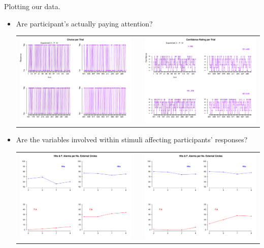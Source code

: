 \documentclass[final]{beamer}
\newlength{\onecolwid}
\newlength{\twocolwid}
\begin{document}
\begin{frame}[t]
\begin{columns}[t]
\begin{column}{\twocolwid}
\begin{columns}[t,totalwidth=\twocolwid]
\begin{column}{\onecolwid}
\begin{alertblock}{Plotting our data.}
\begin{itemize}
\item Are participant's actually paying attention?

\begin{center}
\begin{tabular}{ccc}
\includegraphics[width=0.45\linewidth]{Figures/5_CR.pdf} & \hfill & \includegraphics[width=0.5\linewidth]{Figures/6_ChoicePer.pdf}
\end{tabular}
\end{center}


\item Are the variables involved within stimuli affecting participants' responses?

\begin{center}
\begin{tabular}{ccc}
\includegraphics[width=0.35\linewidth]{Figures/7_ExternalC.pdf} & \hfill & \includegraphics[width=0.35\linewidth]{Figures/7_ExternalCircle.pdf}
\end{tabular}
\end{center}



\end{itemize}
\end{alertblock}
\end{column}
\end{columns}
\end{column}
\end{columns}
\end{frame}
\end{document}
